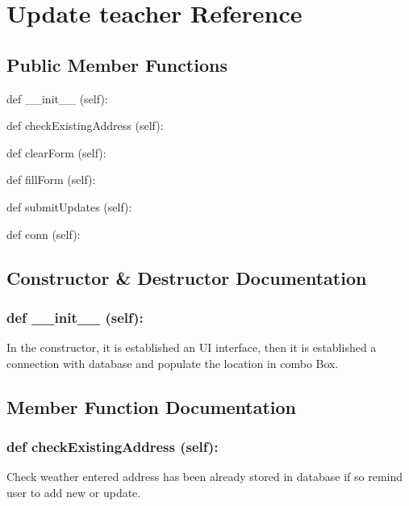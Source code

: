 \hypertarget{Update_teacher}{\section{Update teacher Reference}
\label{Update_teacher}
}
\subsection*{Public Member Functions}
\begin{DoxyCompactItemize}
\item 
def {\_\_init\_\_} (self):
\item 
def {checkExistingAddress} (self):
\item 
def {clearForm} (self):
\item 
def {fillForm} (self):
\item 
def {submitUpdates} (self):
\item 
def {conn} (self):
\end{DoxyCompactItemize}

\subsection{Constructor \& Destructor Documentation}
\hypertarget{class_poly_aa3def076b74bed67904976ad4f9fe9b1}{
\subsubsection[{def __init__ (self):}]{\setlength{\rightskip}{0pt plus 5cm}def {\_\_init\_\_} (self): 
}}
In the constructor, it is established an UI interface, then it is  established a connection with database and populate the location in combo Box.
 

\subsection{Member Function Documentation}
\hypertarget{class_poly_a14a7ad77ce612b0c54f531d307ee4b39}{
\subsubsection[{def checkExistingAddress (self):}]{\setlength{\rightskip}{0pt plus 5cm}def {checkExistingAddress} (self):}}\label{class_poly_a14a7ad77ce612b0c54f531d307ee4b39}
Check weather entered address has been already stored in database if so remind user to add new or update.

